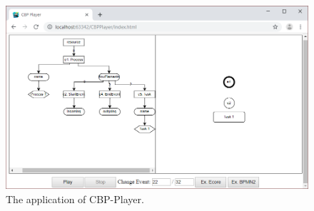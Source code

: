 \documentclass[conference]{IEEEtran}
\begin{document}
\begin{figure}
  \includegraphics[width=\linewidth]{prototype}
  \caption{The application of CBP-Player.}
  \label{fig:implementation}
\end{figure}
\end{document}
